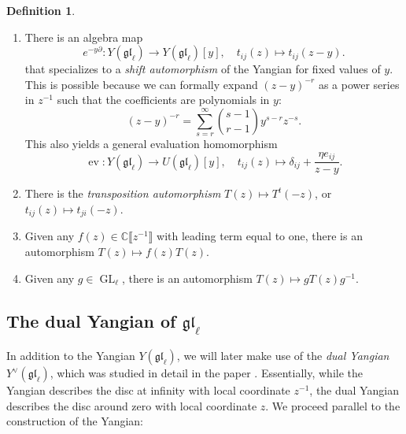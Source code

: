 \documentclass[11pt]{report}
\theoremstyle{definition}
\newtheorem{definition}[theorem]{Definition}
\theoremstyle{remark}
\theoremstyle{remark}
\newcommand{\C}{\mathbb{C}}
\begin{document}
\begin{definition}
\begin{enumerate}[label=(\roman*)]
\item There is an algebra map
\begin{equation*}
e^{-y\partial}: Y(\mathfrak{gl}_\ell) \to Y(\mathfrak{gl}_\ell)[y], \quad t_{ij}(z) \mapsto t_{ij}(z-y).
\end{equation*}
that specializes to a \emph{shift automorphism} of the Yangian for fixed values of $y$. This is possible because we can formally expand $(z-y)^{-r}$ as a power series in $z^{-1}$ such that the coefficients are polynomials in $y$:
\begin{equation*}
(z-y)^{-r} = \sum_{s=r}^\infty {s-1 \choose r-1} y^{s-r} z^{-s}.
\end{equation*}
This also yields a general evaluation homomorphism
\begin{equation*}
\operatorname{ev}: Y(\mathfrak{gl}_\ell) \to U(\mathfrak{gl}_\ell)[y], \quad t_{ij}(z) \mapsto \delta_{ij} + \frac{\eta e_{ij}}{z-y}.
\end{equation*}
\item There is the \emph{transposition automorphism} $T(z) \mapsto T^t(-z)$, or $t_{ij}(z) \mapsto t_{ji}(-z)$.
\item Given any $f(z) \in \C\llbracket z^{-1} \rrbracket$ with leading term equal to one, there is an automorphism $T(z) \mapsto f(z) T(z)$.
\item Given any $g \in \operatorname{GL}_\ell$, there is an automorphism $T(z) \mapsto g T(z) g^{-1}$.
\end{enumerate}
\end{definition}

\subsection{The dual Yangian of $\mathfrak{gl}_\ell$}

In addition to the Yangian $Y(\mathfrak{gl}_\ell)$, we will later make use of the \emph{dual Yangian} $Y^\vee(\mathfrak{gl}_\ell)$, which was studied in detail in the paper \cite{article:nazarov:2019}. Essentially, while the Yangian describes the disc at infinity with local coordinate $z^{-1}$, the dual Yangian describes the disc around zero with local coordinate $z$. We proceed parallel to the construction of the Yangian:
\end{document}
